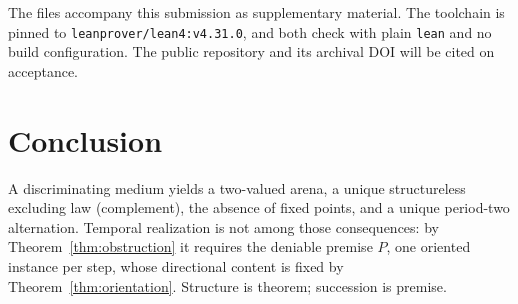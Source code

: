 \documentclass[11pt]{article}
\newcommand{\lf}[1]{\texttt{#1}}
\begin{document}
The files accompany this submission as supplementary material. The toolchain is pinned to \lf{leanprover/lean4:v4.31.0}, and both check with plain \lf{lean} and no build configuration. The public repository and its archival DOI will be cited on acceptance.

\section{Conclusion}

A discriminating medium yields a two-valued arena, a unique structureless excluding law (complement), the absence of fixed points, and a unique period-two alternation. Temporal realization is not among those consequences: by Theorem~\ref{thm:obstruction} it requires the deniable premise $P$, one oriented instance per step, whose directional content is fixed by Theorem~\ref{thm:orientation}. Structure is theorem; succession is premise.
\end{document}
